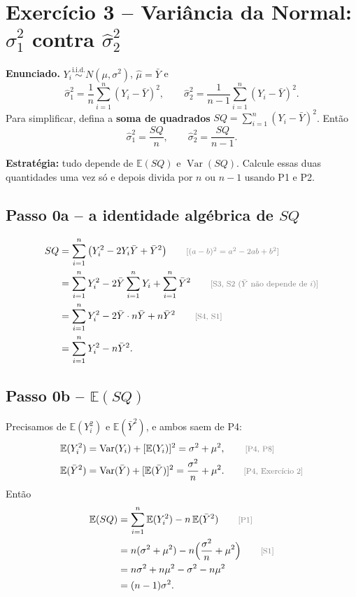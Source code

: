 \documentclass[11pt,a4paper]{article}
\newcommand{\E}{\mathbb{E}}
\newcommand{\Var}{\operatorname{Var}}
\newcommand{\iid}{\overset{\text{i.i.d.}}{\sim}}
\newcommand{\bY}{\bar{Y}}
\newcommand{\just}[1]{\tag*{\footnotesize\textcolor{gray}{[#1]}}}
\begin{document}
\section{Exercício 3 -- Variância da Normal: $\hat\sigma^2_1$ contra $\hat\sigma^2_2$}

\textbf{Enunciado.} $Y_i\iid N(\mu,\sigma^2)$, $\hat\mu=\bY$ e
\[
\hat\sigma^2_1=\frac1n\sum_{i=1}^n(Y_i-\bY)^2,\qquad
\hat\sigma^2_2=\frac1{n-1}\sum_{i=1}^n(Y_i-\bY)^2 .
\]
Para simplificar, defina a \textbf{soma de quadrados} $SQ=\sum_{i=1}^n(Y_i-\bY)^2$. Então
\[
\hat\sigma^2_1=\frac{SQ}{n},\qquad\hat\sigma^2_2=\frac{SQ}{n-1}.
\]
\begin{ideia}
\textbf{Estratégia:} tudo depende de $\E(SQ)$ e $\Var(SQ)$. Calcule essas duas quantidades uma vez só e depois divida por $n$ ou $n-1$ usando P1 e P2.
\end{ideia}

\subsection*{Passo 0a -- a identidade algébrica de $SQ$}
\begin{align*}
SQ&=\sum_{i=1}^n\big(Y_i^2-2Y_i\bY+\bY^2\big) \just{$(a-b)^2=a^2-2ab+b^2$}\\
&=\sum_{i=1}^nY_i^2-2\bY\sum_{i=1}^nY_i+\sum_{i=1}^n\bY^2 \just{S3, S2 ($\bY$ não depende de $i$)}\\
&=\sum_{i=1}^nY_i^2-2\bY\cdot n\bY+n\bY^2 \just{S4, S1}\\
&=\sum_{i=1}^nY_i^2-n\bY^2 .
\end{align*}

\subsection*{Passo 0b -- $\E(SQ)$}
Precisamos de $\E(Y_i^2)$ e $\E(\bY^2)$, e ambos saem de P4:
\begin{align*}
\E(Y_i^2)&=\Var(Y_i)+[\E(Y_i)]^2=\sigma^2+\mu^2, \just{P4, P8}\\
\E(\bY^2)&=\Var(\bY)+[\E(\bY)]^2=\frac{\sigma^2}{n}+\mu^2 . \just{P4, Exercício 2}
\end{align*}
Então
\begin{align*}
\E(SQ)&=\sum_{i=1}^n\E(Y_i^2)-n\,\E(\bY^2) \just{P1}\\
&=n(\sigma^2+\mu^2)-n\Big(\frac{\sigma^2}{n}+\mu^2\Big) \just{S1}\\
&=n\sigma^2+n\mu^2-\sigma^2-n\mu^2\\
&=(n-1)\sigma^2 .
\end{align*}
\end{document}
